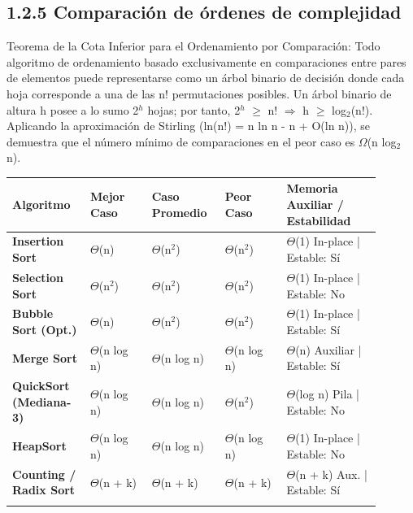 \documentclass[11pt,letterpaper]{article}
\begin{document}
\subsection*{1.2.5 Comparación de órdenes de complejidad}
Teorema de la Cota Inferior para el Ordenamiento por Comparación: Todo algoritmo de ordenamiento basado exclusivamente en comparaciones entre pares de elementos puede representarse como un árbol binario de decisión donde cada hoja corresponde a una de las n! permutaciones posibles. Un árbol binario de altura h posee a lo sumo 2$^h$ hojas; por tanto, 2$^h$ $\ge$ n! $\Longrightarrow$ h $\ge$ log$_2$(n!). Aplicando la aproximación de Stirling (ln(n!) = n ln n - n + O(ln n)), se demuestra que el número mínimo de comparaciones en el peor caso es $\Omega$(n log$_2$ n).\par
\vspace{4pt}\noindent
\begin{tabular}{>{\raggedright\arraybackslash}p{0.194\linewidth}>{\raggedright\arraybackslash}p{0.152\linewidth}>{\raggedright\arraybackslash}p{0.166\linewidth}>{\raggedright\arraybackslash}p{0.152\linewidth}>{\raggedright\arraybackslash}p{0.235\linewidth}}
\toprule
\textbf{\color{ipnguinda}Algoritmo} & \textbf{\color{ipnguinda}Mejor Caso} & \textbf{\color{ipnguinda}Caso Promedio} & \textbf{\color{ipnguinda}Peor Caso} & \textbf{\color{ipnguinda}Memoria Auxiliar / Estabilidad} \\
\midrule
\textbf{Insertion Sort} & $\Theta$(n) & $\Theta$(n$^2$) & $\Theta$(n$^2$) & $\Theta$(1) In-place | Estable: Sí \\
\addlinespace[3pt]
\textbf{Selection Sort} & $\Theta$(n$^2$) & $\Theta$(n$^2$) & $\Theta$(n$^2$) & $\Theta$(1) In-place | Estable: No \\
\addlinespace[3pt]
\textbf{Bubble Sort (Opt.)} & $\Theta$(n) & $\Theta$(n$^2$) & $\Theta$(n$^2$) & $\Theta$(1) In-place | Estable: Sí \\
\addlinespace[3pt]
\textbf{Merge Sort} & $\Theta$(n log n) & $\Theta$(n log n) & $\Theta$(n log n) & $\Theta$(n) Auxiliar | Estable: Sí \\
\addlinespace[3pt]
\textbf{QuickSort (Mediana-3)} & $\Theta$(n log n) & $\Theta$(n log n) & $\Theta$(n$^2$) & $\Theta$(log n) Pila | Estable: No \\
\addlinespace[3pt]
\textbf{HeapSort} & $\Theta$(n log n) & $\Theta$(n log n) & $\Theta$(n log n) & $\Theta$(1) In-place | Estable: No \\
\addlinespace[3pt]
\textbf{Counting / Radix Sort} & $\Theta$(n + k) & $\Theta$(n + k) & $\Theta$(n + k) & $\Theta$(n + k) Aux. | Estable: Sí \\
\addlinespace[3pt]
\bottomrule
\end{tabular}
\vspace{6pt}\par
\end{document}
